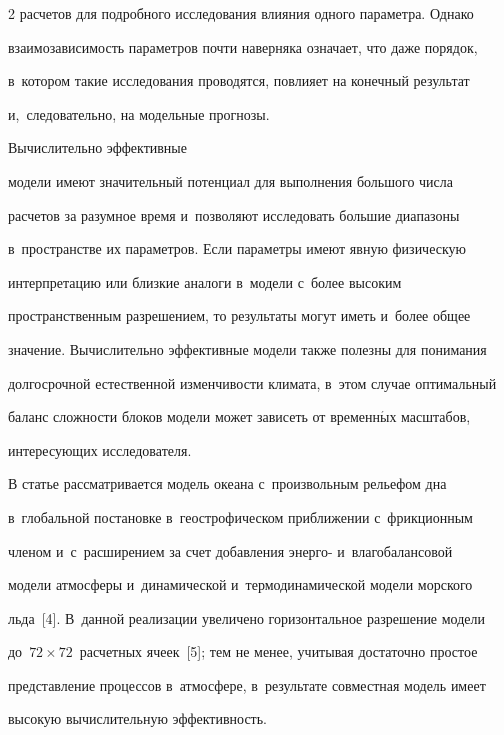 \begin{multicols}{2}
расчетов для подробного исследования влияния одного параметра. Однако 


взаимозависимость параметров почти наверняка означает, что даже порядок, 


в~котором такие исследования проводятся, повлияет на конечный результат 


и,~следовательно, на модельные прогнозы. 





Вычислительно эффективные 


модели имеют значительный потенциал для выполнения большого числа 


расчетов за разумное время и~позволяют исследовать большие диапазоны 


в~пространстве их параметров. Если параметры имеют явную физическую 


интерпретацию или близкие аналоги в~модели с~более высоким 


пространственным разрешением, то результаты могут иметь и~более общее 


значение. Вычислительно эффективные модели также полезны для понимания 


долгосрочной естественной изменчивости климата, в~этом случае оптимальный 


баланс сложности блоков модели может зависеть от временн$\acute{\mbox{ы}}$х масштабов, 


интересующих исследователя. 


  


  В статье рассматривается модель океана с~произвольным рельефом дна 


в~глобальной постановке в~геострофическом приближении с~фрикционным 


членом и~с~расширением за счет добавления энерго- и~влагобалансовой 


модели атмосферы и~динамической и~термодинамической модели морского 


льда~[4]. В~данной реализации увеличено горизонтальное разрешение модели 


до~$72 \times 72$~расчетных ячеек~[5]; тем не менее, учитывая достаточно простое 


представление процессов в~атмосфере, в~результате совместная модель имеет 


высокую вычислительную эффективность.






\end{multicols}
